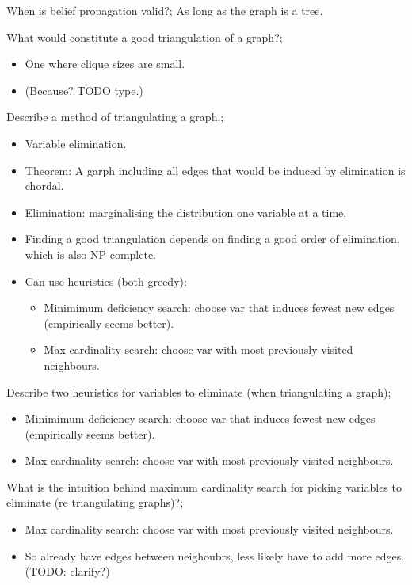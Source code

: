 \documentclass{article}
\begin{document}
When is belief propagation valid?; As long as the graph is a tree.

What would constitute a good triangulation of a graph?; \begin{itemize}
    \item One where clique sizes are small.
    \item (Because? TODO type.)
\end{itemize}

Describe a method of triangulating a graph.; \begin{itemize}
    \item Variable elimination.
    \item Theorem: A garph including all edges that would be induced by elimination is chordal.
    \item Elimination: marginalising the distribution one variable at a time.
    \item Finding a good triangulation depends on finding a good order of elimination, which is also NP-complete.
    \item Can use heuristics (both greedy): \begin{itemize}
        \item Minimimum deficiency search: choose var that induces fewest new edges (empirically seems better).
        \item Max cardinality search: choose var with most previously visited neighbours.
    \end{itemize}
\end{itemize}

Describe two heuristics for variables to eliminate (when triangulating a graph); \begin{itemize}
        \item Minimimum deficiency search: choose var that induces fewest new edges (empirically seems better).
        \item Max cardinality search: choose var with most previously visited neighbours.
    \end{itemize}
    
What is the intuition behind maximum cardinality search for picking variables to eliminate (re triangulating graphs)?; \begin{itemize}
        \item Max cardinality search: choose var with most previously visited neighbours.
    \item So already have edges between neighoubrs, less likely have to add more edges. (TODO: clarify?) 
\end{itemize}
\end{document}
